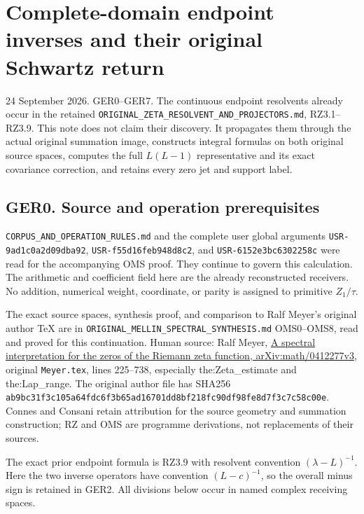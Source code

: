 \section{Complete-domain endpoint inverses and their original Schwartz
return}\label{complete-domain-endpoint-inverses-and-their-original-schwartz-return}

24 September 2026. GER0--GER7. The continuous endpoint resolvents
already occur in the retained
\nolinkurl{ORIGINAL_ZETA_RESOLVENT_AND_PROJECTORS.md}, RZ3.1--RZ3.9. This note
does not claim their discovery. It propagates them through the actual
original summation image, constructs integral formulas on both original
source spaces, computes the full \(L(L-1)\) representative and its exact
covariance correction, and retains every zero jet and support label.

\subsection{GER0. Source and operation
prerequisites}\label{ger0.-source-and-operation-prerequisites}

\nolinkurl{CORPUS_AND_OPERATION_RULES.md} and the complete user global arguments
\nolinkurl{USR-9ad1c0a2d09dba92}, \nolinkurl{USR-f55d16feb948d8c2}, and \nolinkurl{USR-6152e3bc6302258c}
were read for the accompanying OMS proof. They continue to govern this
calculation. The arithmetic and coefficient field here are the already
reconstructed receivers. No addition, numerical weight, coordinate, or
parity is assigned to primitive \(Z_1/\tau\).

The exact source spaces, synthesis proof, and comparison to Ralf Meyer's
original author TeX are in \nolinkurl{ORIGINAL_MELLIN_SPECTRAL_SYNTHESIS.md}
OMS0--OMS8, read and proved for this continuation. Human source: Ralf
Meyer, \href{https://arxiv.org/abs/math/0412277v3}{A spectral
interpretation for the zeros of the Riemann zeta function,
arXiv:math/0412277v3}, original \nolinkurl{Meyer.tex}, lines 225--738, especially
the:Zeta\_estimate and the:Lap\_range. The original author file has
SHA256 \nolinkurl{ab9bc31f3c105a64fdc6f3b65ad16701dd8bf218fc90df98fe8d7f3c7c58c00e}.
Connes and Consani retain attribution for the source geometry and
summation construction; RZ and OMS are programme derivations, not
replacements of their sources.

The exact prior endpoint formula is RZ3.9 with resolvent convention
\((\lambda-L)^{-1}\). Here the two inverse operators have convention
\((L-c)^{-1}\), so the overall minus sign is retained in GER2. All
divisions below occur in named complex receiving spaces.

